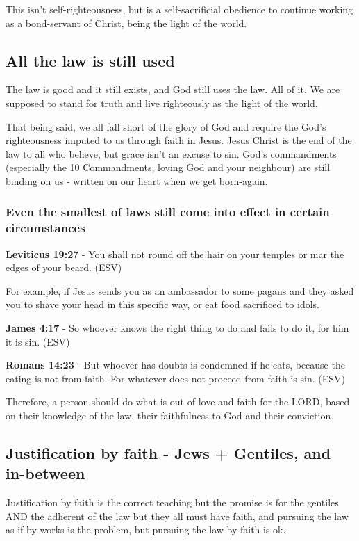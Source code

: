 \documentclass[11pt]{article}
\begin{document}
This isn't self-righteousness, but is a self-sacrificial obedience to continue working as a bond-servant of Christ, being the light of the world.

\subsection{All the law is still used}
\label{sec:orgae1158e}
The law is good and it still exists, and God still uses the law. All of it. We are supposed to stand for truth and live righteously as the light of the world.

That being said, we all fall short of the glory of God and require the God's righteousness imputed to us through faith in Jesus.
Jesus Christ is the end of the law to all who believe, but grace isn't an excuse to sin.
God's commandments (especially the 10 Commandments; loving God and your neighbour) are still binding on us - written on our heart when we get born-again.

\subsubsection{Even the smallest of laws still come into effect in certain circumstances}
\label{sec:org46c2d38}

\textbf{Leviticus 19:27} - You shall not round off the hair on your temples or mar the edges of your beard. (ESV)

For example, if Jesus sends you as an ambassador to some pagans and they asked you to shave your head in this specific way, or eat food sacrificed to idols.

\textbf{James 4:17} - So whoever knows the right thing to do and fails to do it, for him it is sin. (ESV)

\textbf{Romans 14:23} - But whoever has doubts is condemned if he eats, because the eating is not from faith. For whatever does not proceed from faith is sin. (ESV)

Therefore, a person should do what is out of love and faith for the LORD, based on their knowledge of the law,
their faithfulness to God and their conviction.

\subsection{Justification by faith - Jews + Gentiles, and in-between}
\label{sec:org1bbaaa8}
Justification by faith is the correct teaching but the promise is for the gentiles AND the adherent of the law but they all must have faith, and pursuing the law as if by works is the problem, but pursuing the law by faith is ok.
\end{document}
